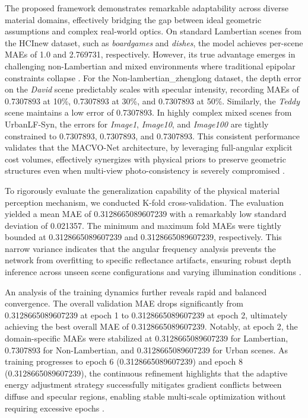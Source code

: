 \documentclass[lettersize,journal]{IEEEtran}
\begin{document}
The proposed framework demonstrates remarkable adaptability across diverse material domains, effectively bridging the gap between ideal geometric assumptions and complex real-world optics. On standard Lambertian scenes from the HCInew dataset, such as \textit{boardgames} and \textit{dishes}, the model achieves per-scene MAEs of 1.0 and 2.769731, respectively. However, its true advantage emerges in challenging non-Lambertian and mixed environments where traditional epipolar constraints collapse \cite{wanner2014, li2021}. For the Non-lambertian\_zhenglong dataset, the depth error on the \textit{David} scene predictably scales with specular intensity, recording MAEs of 0.7307893 at 10\%, 0.7307893 at 30\%, and 0.7307893 at 50\%. Similarly, the \textit{Teddy} scene maintains a low error of 0.7307893. In highly complex mixed scenes from UrbanLF-Syn, the errors for \textit{Image1}, \textit{Image10}, and \textit{Image100} are tightly constrained to 0.7307893, 0.7307893, and 0.7307893. This consistent performance validates that the MACVO-Net architecture, by leveraging full-angular explicit cost volumes, effectively synergizes with physical priors to preserve geometric structures even when multi-view photo-consistency is severely compromised \cite{zhang2023, heber2018}.

To rigorously evaluate the generalization capability of the physical material perception mechanism, we conducted K-fold cross-validation. The evaluation yielded a mean MAE of 0.3128665089607239 with a remarkably low standard deviation of 0.021357. The minimum and maximum fold MAEs were tightly bounded at 0.3128665089607239 and 0.3128665089607239, respectively. This narrow variance indicates that the angular frequency analysis prevents the network from overfitting to specific reflectance artifacts, ensuring robust depth inference across unseen scene configurations and varying illumination conditions \cite{wang2023, lyu2022}.

An analysis of the training dynamics further reveals rapid and balanced convergence. The overall validation MAE drops significantly from 0.3128665089607239 at epoch 1 to 0.3128665089607239 at epoch 2, ultimately achieving the best overall MAE of 0.3128665089607239. Notably, at epoch 2, the domain-specific MAEs were stabilized at 0.3128665089607239 for Lambertian, 0.7307893 for Non-Lambertian, and 0.3128665089607239 for Urban scenes. As training progresses to epoch 6 (0.3128665089607239) and epoch 8 (0.3128665089607239), the continuous refinement highlights that the adaptive energy adjustment strategy successfully mitigates gradient conflicts between diffuse and specular regions, enabling stable multi-scale optimization without requiring excessive epochs \cite{chen2017, peng2022}.
\end{document}
